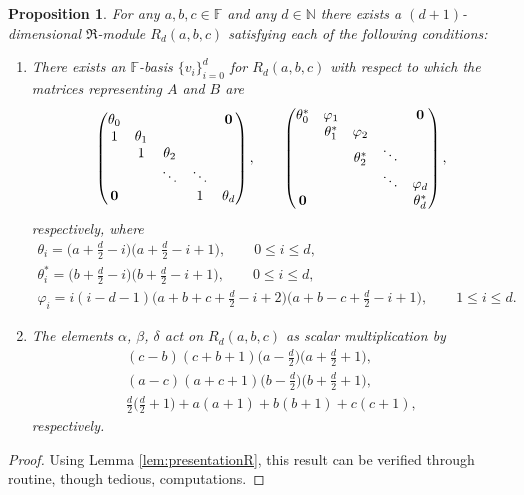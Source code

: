 \documentclass[11pt]{article}
\numberwithin{equation}{section}
\def\N{\mathbb N}
\def\F{\mathbb F}
\numberwithin{equation}{section}
\newtheorem{Proposition}[Theorem]{Proposition}
 { \theoremstyle{definition}
\newtheorem{Definition}[Theorem]{Definition}
\newtheorem{Example}[Theorem]{Example} }
\begin{document}
\begin{Proposition}\label{prop:Rd}For any $a,b,c\in \F$ and any $d\in \N$ there exists a $(d+1)$-dimensional $\Re$-module $R_d(a,b,c)$ satisfying each of the following conditions:
\begin{enumerate}\itemsep=0pt
\item[$(i)$] There exists an $\F$-basis $\{v_i\}_{i=0}^d$ for $R_d(a,b,c)$ with respect to which the matrices represen\-ting $A$ and $B$ are
\begin{gather*}
\begin{pmatrix}
\theta_0 & & & &{\bf 0}
\\
1 &\theta_1
\\
&1 &\theta_2
 \\
& &\ddots &\ddots
 \\
{\bf 0} & & &1 &\theta_d
\end{pmatrix},
\qquad
\begin{pmatrix}
\theta_0^* &\varphi_1 & & &{\bf 0}
\\
 &\theta_1^* &\varphi_2
\\
 & &\theta_2^* &\ddots
 \\
 & & &\ddots &\varphi_d
 \\
{\bf 0} & & & &\theta_d^*
\end{pmatrix},
\end{gather*}
respectively, where
\begin{gather*}
\theta_i=\big(a+\textstyle\frac{d}{2}-i\big) \big(a+\textstyle\frac{d}{2}-i+1\big), \qquad 0\leq i\leq d,\\
\theta^*_i=\big(b+\textstyle\frac{d}{2}-i\big)\big(b+\textstyle\frac{d}{2}-i+1\big), \qquad 0\leq i\leq d,
\\
\varphi_i=i(i-d-1)\big(a+b+c+\textstyle\frac{d}{2}-i+2\big)\big(a+b-c+\textstyle\frac{d}{2}-i+1\big),
\qquad 1\leq i\leq d.
\end{gather*}

\item[$(ii)$] The elements $\alpha$, $\beta$, $\delta$ act on $R_d (a,b,c)$ as scalar multiplication by
\begin{gather*}
(c-b)(c+b+1)\big(a-\textstyle\frac{d}{2}\big)\big(a+\textstyle\frac{d}{2}+1\big),\\
(a-c)(a+c+1)\big(b-\textstyle\frac{d}{2}\big)\big(b+\textstyle\frac{d}{2}+1\big),\\
\textstyle\frac{d}{2} \big(\textstyle\frac{d}{2}+1\big)+a(a+1)+b(b+1)+c(c+1),
\end{gather*}
respectively.
\end{enumerate}
\end{Proposition}
\begin{proof} Using Lemma \ref{lem:presentationR}, this result can be verified through routine, though tedious, computations.
\end{proof}
\end{document}
